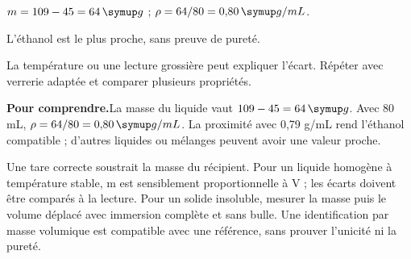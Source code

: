 \par\noindent\begin{minipage}{\linewidth}
\label{cor-defi-1}\begin{questions}
\item $m=109-45=64\unite g$ ; $\rho=64/80=0{,}80\unite{g/mL}$.
\item L’éthanol est le plus proche, sans preuve de pureté.
\item La température ou une lecture grossière peut expliquer l’écart. Répéter avec verrerie adaptée et comparer plusieurs propriétés.
\end{questions}
\par\smallskip\noindent\textbf{Pour comprendre.}\enspace La masse du liquide vaut $109-45=64\unite g$. Avec 80 mL, $\rho=64/80=0{,}80\unite{g/mL}$. La proximité avec 0,79 g/mL rend l’éthanol compatible ; d’autres liquides ou mélanges peuvent avoir une valeur proche.\par
{}
\end{minipage}
\par\noindent\begin{minipage}{\linewidth}
\label{cor-activite-1}
Une tare correcte soustrait la masse du récipient. Pour un liquide homogène à température stable, m est sensiblement proportionnelle à V ; les écarts doivent être comparés à la lecture. Pour un solide insoluble, mesurer la masse puis le volume déplacé avec immersion complète et sans bulle. Une identification par masse volumique est compatible avec une référence, sans prouver l’unicité ni la pureté.\par\end{minipage}
